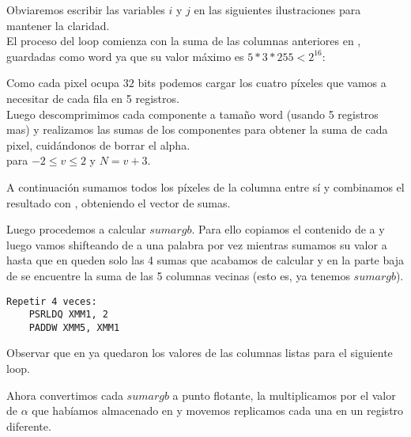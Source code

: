Obviaremos escribir las variables $i$ y $j$ en las siguientes ilustraciones para mantener la claridad. \\

El proceso del loop comienza con la suma de las columnas anteriores en , guardadas como word ya que su valor máximo es $5 * 3 * 255 < 2^{16}$: \\

 

Como cada pixel ocupa $32$ bits podemos cargar los cuatro píxeles que vamos a necesitar de cada fila en 5 registros. \\
Luego descomprimimos cada componente a tamaño word (usando 5 registros mas) y realizamos las sumas de los componentes para obtener la suma de cada pixel, cuidándonos de borrar el alpha. \\

  para $-2 \le v \le 2$ y $N = v+3$.

A continuación sumamos todos los píxeles de la columna entre sí y combinamos el resultado con , obteniendo el vector de sumas. \\

 

Luego procedemos a calcular $sumargb$. Para ello copiamos el contenido de  a  y luego vamos shifteando  de a una palabra por vez mientras sumamos su valor a  hasta que en  queden solo las 4 sumas que acabamos de calcular y en la parte baja de  se encuentre la suma de las 5 columnas vecinas (esto es, ya tenemos $sumargb$).

\begin{lstlisting}
Repetir 4 veces:
    PSRLDQ XMM1, 2
    PADDW XMM5, XMM1
\end{lstlisting}

 

 

Observar que en  ya quedaron los valores de las columnas listas para el siguiente loop.

Ahora convertimos cada $sumargb$ a punto flotante, la multiplicamos por el valor de $\alpha$ que habíamos almacenado en  y movemos replicamos cada una en un registro diferente. \\

